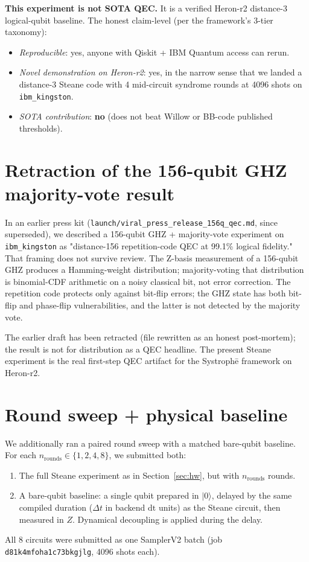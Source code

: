 \documentclass[11pt,letterpaper]{article}
\providecommand{\Systrophe}{Systroph\=e}
\begin{document}
\textbf{This experiment is not SOTA QEC.} It is a verified Heron-r2 distance-3 logical-qubit baseline. The honest claim-level (per the framework's 3-tier taxonomy):
\begin{itemize}[leftmargin=*,itemsep=0pt]
\item \emph{Reproducible}: yes, anyone with Qiskit + IBM Quantum access can rerun.
\item \emph{Novel demonstration on Heron-r2}: yes, in the narrow sense that we landed a distance-3 Steane code with 4 mid-circuit syndrome rounds at 4096 shots on \texttt{ibm\_kingston}.
\item \emph{SOTA contribution}: \textbf{no} (does not beat Willow or BB-code published thresholds).
\end{itemize}

\section{Retraction of the 156-qubit GHZ majority-vote result}\label{sec:retraction}

In an earlier press kit (\texttt{launch/viral\_press\_release\_156q\_qec.md}, since superseded), we described a 156-qubit GHZ + majority-vote experiment on \texttt{ibm\_kingston} as "distance-156 repetition-code QEC at 99.1\% logical fidelity." That framing does not survive review. The Z-basis measurement of a 156-qubit GHZ produces a Hamming-weight distribution; majority-voting that distribution is binomial-CDF arithmetic on a noisy classical bit, not error correction. The repetition code protects only against bit-flip errors; the GHZ state has both bit-flip and phase-flip vulnerabilities, and the latter is not detected by the majority vote.

The earlier draft has been retracted (file rewritten as an honest post-mortem); the result is not for distribution as a QEC headline. The present Steane experiment is the real first-step QEC artifact for the \Systrophe{} framework on Heron-r2.

\section{Round sweep + physical baseline}\label{sec:round_sweep}

We additionally ran a paired round sweep with a matched bare-qubit baseline. For each $n_{\mathrm{rounds}} \in \{1, 2, 4, 8\}$, we submitted both:
\begin{enumerate}[leftmargin=*,itemsep=0pt]
\item The full Steane experiment as in Section~\ref{sec:hw}, but with $n_{\mathrm{rounds}}$ rounds.
\item A bare-qubit baseline: a single qubit prepared in $|0\rangle$, delayed by the same compiled duration ($\Delta t$ in backend $\mathrm{dt}$ units) as the Steane circuit, then measured in $Z$. Dynamical decoupling is applied during the delay.
\end{enumerate}
All 8 circuits were submitted as one SamplerV2 batch (job \texttt{d81k4mfoha1c73bkgjlg}, 4096 shots each).
\end{document}
